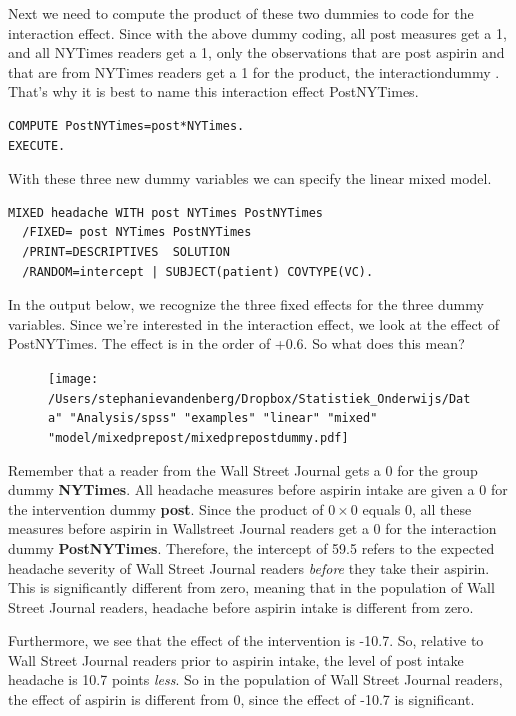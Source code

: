 \documentclass[]{report}\usepackage[]{graphicx}\usepackage[]{color}
\begin{document}
Next we need to compute the product of these two dummies to code for the interaction effect. Since with the above dummy coding, all post measures get a 1, and all NYTimes readers get a 1, only the observations that are post aspirin and that are from NYTimes readers get a 1 for the product, the interactiondummy . That's why it is best to name this interaction effect PostNYTimes. 

\begin{verbatim}
COMPUTE PostNYTimes=post*NYTimes.
EXECUTE.
\end{verbatim}

With these three new dummy variables we can specify the linear mixed model.

\begin{verbatim}
MIXED headache WITH post NYTimes PostNYTimes
  /FIXED= post NYTimes PostNYTimes
  /PRINT=DESCRIPTIVES  SOLUTION
  /RANDOM=intercept | SUBJECT(patient) COVTYPE(VC).
\end{verbatim}


In the output below, we recognize the three fixed effects for the three dummy variables. Since we're interested in the interaction effect, we look at the effect of PostNYTimes. The effect is in the order of +0.6. So what does this mean? 

\begin{figure}[h]
    \begin{center}
       \texttt{[image: /Users/stephanievandenberg/Dropbox/Statistiek\_Onderwijs/Data" "Analysis/spss" "examples" "linear" "mixed" "model/mixedprepost/mixedprepostdummy.pdf]}
    \end{center}
\end{figure}



Remember that a reader from the Wall Street Journal gets a 0 for the group dummy \textbf{NYTimes}. All headache measures before aspirin intake are given a 0 for the intervention dummy \textbf{post}. 
Since the product of $ 0\times 0$ equals 0, all these measures before aspirin in Wallstreet Journal readers get a 0 for the interaction dummy \textbf{PostNYTimes}.
Therefore, the intercept of 59.5 refers to the expected headache severity of Wall Street Journal readers \textit{before} they take their aspirin. This is significantly different from zero, meaning that in the population of Wall Street Journal readers, headache before aspirin intake is different from zero.

Furthermore, we see that the effect of the intervention is -10.7. So, relative to Wall Street Journal readers prior to aspirin intake, the level of post intake headache is 10.7 points \textit{less}. So in the population of Wall Street Journal readers, the effect of aspirin is different from 0, since the effect of -10.7 is significant. 
\end{document}
